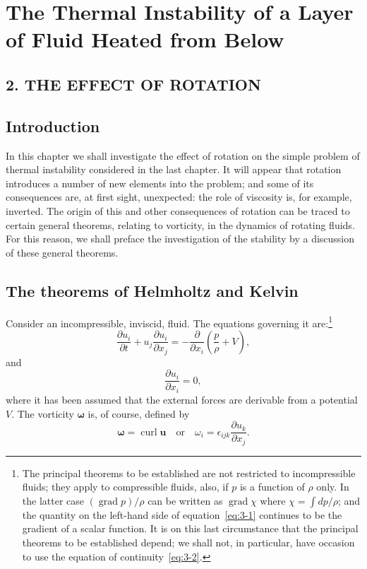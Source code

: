 \chapter{The Thermal Instability of a Layer of Fluid Heated from Below}
\label{ch:3}

\section*{2. THE EFFECT OF ROTATION}

\section{Introduction}\label{sec:3-19}
In this chapter we shall investigate the effect of rotation on the simple problem of thermal instability considered in the last chapter. It will appear that rotation introduces a number of new elements into the problem; and some of its consequences are, at first sight, unexpected: the role of viscosity is, for example, inverted. The origin of this and other consequences of rotation can be traced to certain general theorems, relating to vorticity, in the dynamics of rotating fluids. For this reason, we shall preface the investigation of the stability by a discussion of these general theorems.

\section{The theorems of Helmholtz and Kelvin}\label{sec:3-20}
Consider an incompressible, inviscid, fluid. The equations governing it are:\footnote{The principal theorems to be established are not restricted to incompressible fluids; they apply to compressible fluids, also, if $p$ is a function of $\rho$ only. In the latter case $(\operatorname{grad} p)/\rho$ can be written as $\operatorname{grad} \chi$ where $\chi = \int dp/\rho$; and the quantity on the left-hand side of equation~\eqref{eq:3-1} continues to be the gradient of a scalar function. It is on this last circumstance that the principal theorems to be established depend; we shall not, in particular, have occasion to use the equation of continuity~\eqref{eq:3-2}.}
\begin{equation}\label{eq:3-1}
\frac{\partial u_i}{\partial t} + u_j \frac{\partial u_i}{\partial x_j} = -\frac{\partial}{\partial x_i}\!\left(\frac{p}{\rho} + V\right),
\end{equation}
and\dag
\begin{equation}\label{eq:3-2}
\frac{\partial u_i}{\partial x_i} = 0,
\end{equation}
where it has been assumed that the external forces are derivable from a potential $V$. The vorticity $\boldsymbol{\omega}$ is, of course, defined by
\begin{equation}\label{eq:3-3}
\boldsymbol{\omega} = \operatorname{curl} \mathbf{u} \quad \text{or} \quad \omega_i = \epsilon_{ijk}\frac{\partial u_k}{\partial x_j}.
\end{equation}

